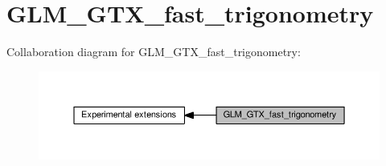 \hypertarget{group__gtx__fast__trigonometry}{}\section{G\+L\+M\+\_\+\+G\+T\+X\+\_\+fast\+\_\+trigonometry}
\label{group__gtx__fast__trigonometry}
Collaboration diagram for G\+L\+M\+\_\+\+G\+T\+X\+\_\+fast\+\_\+trigonometry\+:
\nopagebreak
\begin{figure}[H]
\begin{center}
\leavevmode
\includegraphics[width=350pt]{d5/dad/group__gtx__fast__trigonometry}
\end{center}
\end{figure}
